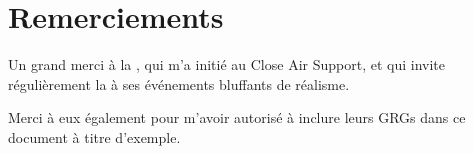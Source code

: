 \chapter*{Remerciements}
{}

Un grand merci à la \onethreetwo{}, qui m'a initié au Close Air Support, et qui invite régulièrement la \thirdwing{} à ses événements bluffants de réalisme.

Merci à eux également pour m'avoir autorisé à inclure leurs GRGs dans ce document à titre d'exemple.